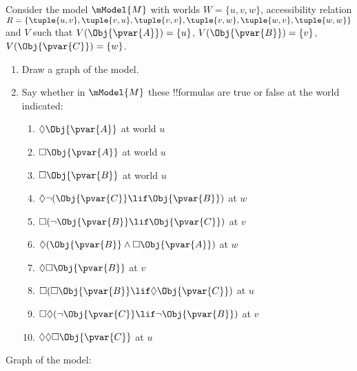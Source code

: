 \documentclass[../../../include/open-logic-section]{subfiles}
\begin{document}
\begin{prob}
    Consider the model $\mModel{M}$ with worlds $W = \{u,v,w\}$, accessibility
    relation $R=\{\tuple{u,v},\tuple{v,u},\tuple{v,v},\tuple{v,w},\tuple{w,v},\tuple{w,w}\}$ 
    and $V$ such that $V(\Obj{\pvar{A}}) = \{ u \}$, $V(\Obj{\pvar{B}}) = \{ v \}$, $V(\Obj{\pvar{C}}) = \{ w \}$.
    
    \begin{enumerate}
    \item Draw a graph of the model. 
    \item Say whether in $\mModel{M}$ these !!{formula}s are true or false 
        at the world indicated:
        \begin{enumerate}
            \item $\Diamond \Obj{\pvar{A}}$ at world $u$
            \item $\Box \Obj{\pvar{A}}$ at world $u$
            \item $\Box \Obj{\pvar{B}}$ at world $u$
            \item $\Diamond\lnot(\Obj{\pvar{C}}\lif \Obj{\pvar{B}})$ at $w$
            \item $\Box(\lnot \Obj{\pvar{B}}\lif \Obj{\pvar{C}})$ at $v$
            \item $\Diamond(\Obj{\pvar{B}}\land\Box \Obj{\pvar{A}})$ at $w$
            \item $\Diamond\Box \Obj{\pvar{B}}$ at $v$
            \item $\Box(\Box \Obj{\pvar{B}}\lif\Diamond \Obj{\pvar{C}})$ at $u$
            \item $\Box\Diamond(\lnot \Obj{\pvar{C}}\lif\lnot \Obj{\pvar{B}})$ at $v$
            \item $\Diamond\Diamond\Box \Obj{\pvar{C}}$ at $u$
        \end{enumerate}
    \end{enumerate}
    
    \begin{ans}
    Graph of the model:
    

\end{ans}
\end{prob}
\end{document}
